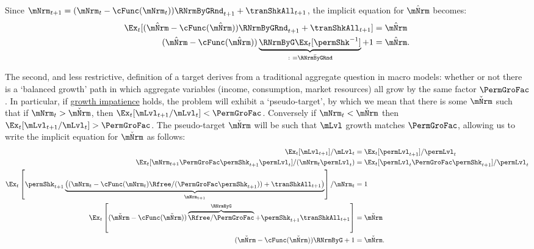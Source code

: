 \documentclass[\econtexRoot/BufferStockTheory]{subfiles}
\begin{document}

\hypertarget{mTargImplicit}{}
Since $\mNrm_{t+1}= (\mNrm_{t}-\cFunc(\mNrm_{t}))\RNrmByGRnd_{t+1}  +\tranShkAll_{t+1}$, the implicit equation for $\mTrgNrm$ becomes:
%
\begin{equation} \label{eq:mTargImplicit}
  \begin{aligned}
    \Ex_{t} [(\mTrgNrm-\cFunc(\mTrgNrm))\RNrmByGRnd_{t+1}+\tranShkAll_{t+1}] & = \mTrgNrm     \\   (\mTrgNrm-\cFunc(\mTrgNrm))\underbrace{\RNrmByG\Ex_{t}[\permShk^{-1}]}_{\colon = \bar{\RNrmByGRnd}}+1 & = \mTrgNrm .
  \end{aligned}
\end{equation}

\hypertarget{Collective-Stability}{}
\hypertarget{pseudo-steady-state}{}


The second, and less restrictive, definition of a target derives from a traditional aggregate question in macro models: whether or not there is a `balanced growth' path in which aggregate variables (income, consumption, market resources) all grow by the same factor $\PermGroFac$.
In particular, if \hyperlink{GICRaw}{growth impatience} holds, the problem will exhibit a `pseudo-target', by which we mean that there is some ${\mBalLvl}$ such that if $\mNrm_{t}>{\mBalLvl}$, then $\Ex_{t}[\mLvl_{t+1}/\mLvl_{t}] < \PermGroFac$.\hypertarget{balgrostable}{}
\hypertarget{balgrostableSolve}{}
Conversely if $\mNrm_{t}<{\mBalLvl}$ then $\Ex_{t}[\mLvl_{t+1}/\mLvl_{t}] > \PermGroFac$.
The pseudo-target $\mBalLvl$ will be such that $\mLvl$ growth matches $\PermGroFac$, allowing us to write the implicit equation for $\mBalLvl$ as follows:
%
\begin{equation}\label{eq:balgrostable}
  \begin{aligned}
    \Ex_{t}[\mLvl_{t+1}]/\mLvl_{t} & =\Ex_{t}[\permLvl_{t+1}]/\permLvl_{t}
    \\  \Ex_{t}[\mNrm_{t+1}\PermGroFac\permShk_{t+1}\permLvl_{t}]/(\mNrm_{t}\permLvl_{t}) & =\Ex_{t}[\permLvl_{t}\PermGroFac\permShk_{t+1}]/\permLvl_{t}
    \\ \Ex_{t}\left[\permShk_{t+1}\underbrace{\left((\mNrm_{t}-\usual{\cFunc}(\mNrm_{t})\Rfree/(\PermGroFac\permShk_{t+1}))+\tranShkAll_{t+1}\right)}_{\mNrm_{t+1}}\right]/\mNrm_{t} & = 1
    \\ 
    \Ex_{t}\left[(\mBalLvl-\usual{\cFunc}(\mBalLvl))\overbrace{\Rfree/\PermGroFac}^{\RNrmByG}+\permShk_{t+1}\tranShkAll_{t+1}\right] & = \mBalLvl
    \\  (\mBalLvl-\usual{\cFunc}(\mBalLvl))\RNrmByG + 1 & = \mBalLvl .
  \end{aligned}
\end{equation}
\end{document}
